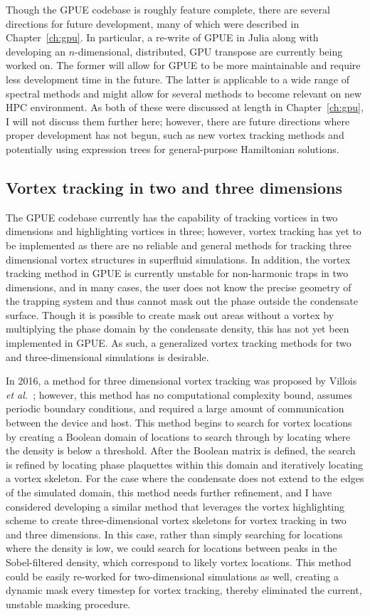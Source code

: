 Though the GPUE codebase is roughly feature complete, there are several directions for future development, many of which were described in Chapter~\ref{ch:gpu}.
In particular, a re-write of GPUE in Julia along with developing an $n$-dimensional, distributed, GPU transpose are currently being worked on.
The former will allow for GPUE to be more maintainable and require less development time in the future.
The latter is applicable to a wide range of spectral methods and might allow for several methods to become relevant on new HPC environment.
As both of these were discussed at length in Chapter~\ref{ch:gpu}, I will not discuss them further here; however,
there are future directions where proper development has not begun, such as new vortex tracking methods and potentially using expression trees for general-purpose Hamiltonian solutions.

\subsection{Vortex tracking in two and three dimensions}

The GPUE codebase currently has the capability of tracking vortices in two dimensions and highlighting vortices in three; however, vortex tracking has yet to be implemented as there are no reliable and general methods for tracking three dimensional vortex structures in superfluid simulations.
In addition, the vortex tracking method in GPUE is currently unstable for non-harmonic traps in two dimensions, and in many cases, the user does not know the precise geometry of the trapping system and thus cannot mask out the phase outside the condensate surface.
Though it is possible to create mask out areas without a vortex by multiplying the phase domain by the condensate density, this has not yet been implemented in GPUE.
As such, a generalized vortex tracking methods for two and three-dimensional simulations is desirable.

In 2016, a method for three dimensional vortex tracking was proposed by Villois \textit{et al.}~\cite{villois2016}; however, this method has no computational complexity bound, assumes periodic boundary conditions, and required a large amount of communication between the device and host.
This method begins to search for vortex locations by creating a Boolean domain of locations to search through by locating where the density is below a threshold.
After the Boolean matrix is defined, the search is refined by locating phase plaquettes within this domain and iteratively locating a vortex skeleton.
For the case where the condensate does not extend to the edges of the simulated domain, this method needs further refinement, and
I have considered developing a similar method that leverages the vortex highlighting scheme to create three-dimensional vortex skeletons for vortex tracking in two and three dimensions.
In this case, rather than simply searching for locations where the density is low, we could search for locations between peaks in the Sobel-filtered density, which correspond to likely vortex locations.
This method could be easily re-worked for two-dimensional simulations as well, creating a dynamic mask every timestep for vortex tracking, thereby eliminated the current, unstable masking procedure.

